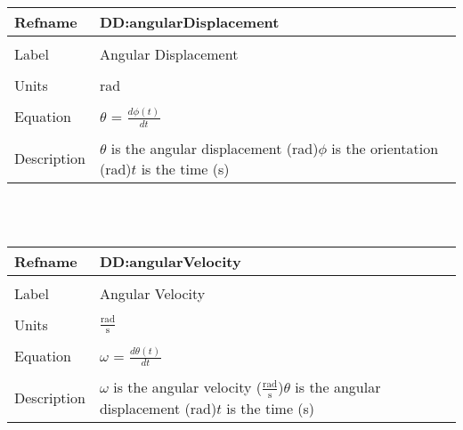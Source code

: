 \documentclass[12pt]{article}
\begin{document}
\noindent \begin{minipage}{\textwidth}
\begin{tabular}{p{} p{}}
\toprule \textbf{Refname} & \textbf{DD:angularDisplacement}
\label{DD:angularDisplacement}
\\ \midrule \\
Label & Angular Displacement
\\ \midrule \\
Units & rad
\\ \midrule \\
Equation & $\theta{}$ = $\frac{d \phi{}\left(t\right)}{d t}$
\\ \midrule \\
Description & $\theta{}$ is the angular displacement (rad)\newline$\phi{}$ is the orientation (rad)\newline$t$ is the time (s)
\\ \bottomrule \end{tabular}
\end{minipage}\\
~\newline
\noindent \begin{minipage}{\textwidth}
\begin{tabular}{p{} p{}}
\toprule \textbf{Refname} & \textbf{DD:angularVelocity}
\label{DD:angularVelocity}
\\ \midrule \\
Label & Angular Velocity
\\ \midrule \\
Units & $\frac{\text{rad}}{\text{s}}$
\\ \midrule \\
Equation & $\omega{}$ = $\frac{d \theta{}\left(t\right)}{d t}$
\\ \midrule \\
Description & $\omega{}$ is the angular velocity ($\frac{\text{rad}}{\text{s}}$)\newline$\theta{}$ is the angular displacement (rad)\newline$t$ is the time (s)
\\ \bottomrule \end{tabular}
\end{minipage}\\
~\newline
\end{document}
